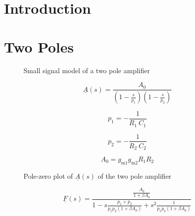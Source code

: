 \documentclass{article}[11pt]
\begin{document}
\notetitle

\section{Introduction}


\section{Two Poles}

\begin{figure}[h]
  \centering
  \begin{circuitikz}[scale=0.95]
    
  \end{circuitikz}
  \caption{Small signal model of a two pole amplifier}
  \label{fig:plot}
\end{figure}


\begin{equation}
  \underline{A}(s) = \frac{A_0}{\left(1-\frac{s}{p_1}\right)\left(1-\frac{s}{p_2}\right)}
\end{equation}

\begin{equation}
  p_1 = -\frac{1}{R_1 \ C_1}
\end{equation}

\begin{equation}
  p_2 = -\frac{1}{R_2 \ C_2}
\end{equation}

\begin{equation}
  A_0 = g_{\mathrm{m1}} g_{\mathrm{m2}} R_1 R_2
\end{equation}

\begin{figure}[h]
  \centering
  \caption{Pole-zero plot of $\underline{A}(s)$ of the two pole amplifier}
  \label{fig:pw-as-2p}
\end{figure}


\begin{equation}
  \underline{F}(s) = \frac{\frac{A_0}{1+\beta A_0}}{1 -s \frac{p_1+p_2}{p_1 p_2 (1+\beta A_0)} + s^2 \frac{1}{p_1 p_2 (1+\beta A_0)}}
\end{equation}
\end{document}
